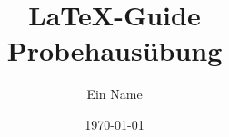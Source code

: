 \documentclass[
    ngerman,
    points=true,
    accentcolor=8c,
    type=intern,
    logofile=./import/tuda_logo.pdf,
    marginpar=false,
    HTML
]{tudaexercise}
\title{LaTeX-Guide \\ Probehausübung}
\date{\today}
\author{Ein Name}
\begin{document}
\maketitle{} %
\end{document}
